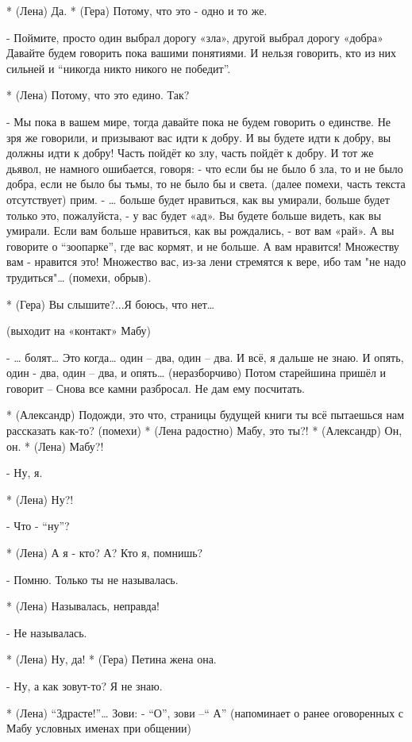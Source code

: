 * (Лена) Да.
* (Гера) Потому, что это - одно и то же.

- Поймите, просто один выбрал дорогу «зла», другой выбрал дорогу «добра» Давайте будем говорить пока вашими понятиями. И нельзя говорить, кто из них сильней и “никогда никто никого не победит”.

* (Лена) Потому, что это едино. Так?

- Мы пока в вашем мире, тогда давайте пока не будем говорить о единстве. Не зря же говорили, и призывают вас идти к добру. И вы будете идти к добру, вы должны идти к добру! Часть пойдёт ко злу, часть пойдёт к добру. И тот же дьявол, не намного ошибается, говоря: - что если бы не было б зла, то и не было  добра, если не было бы тьмы, то не было бы и света. (далее помехи, часть текста отсутствует) прим.
- … больше будет нравиться, как вы умирали, больше будет только это, пожалуйста, - у вас будет «ад». Вы будете больше видеть, как вы умирали. Если вам больше нравиться, как вы рождались, - вот вам «рай». А вы говорите о “зоопарке”, где вас кормят, и не больше. А вам нравится! Множеству вам - нравится это! Множество вас, из-за лени стремятся к вере, ибо там "не надо трудиться"… (помехи, обрыв).

* (Гера) Вы слышите?...Я боюсь, что нет…

(выходит на «контакт» Мабу)

- … болят… Это когда… один – два, один – два. И всё, я дальше не знаю. И опять, один - два, один – два, и опять… (неразборчиво) Потом старейшина пришёл и говорит – Снова все камни разбросал. Не дам ему посчитать.

* (Александр) Подожди, это что, страницы будущей книги ты всё пытаешься нам рассказать как-то? (помехи)
* (Лена радостно) Мабу, это ты?!
* (Александр) Он, он.
* (Лена) Мабу?!

- Ну, я.

* (Лена) Ну?!

- Что - “ну”?

* (Лена) А я - кто? А? Кто я, помнишь?

- Помню. Только ты не называлась.

* (Лена) Называлась, неправда!

- Не называлась.

* (Лена) Ну, да!
* (Гера) Петина жена она.

- Ну, а как зовут-то?  Я не знаю.

* (Лена) “Здрасте!”… Зови: - “О”, зови –“ А” (напоминает о ранее оговоренных с Мабу условных именах при общении)

